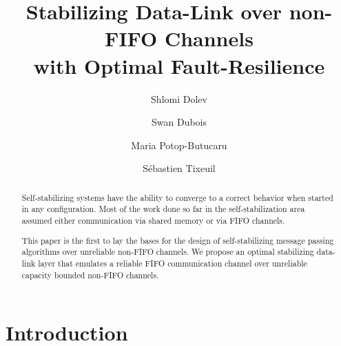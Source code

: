 \documentclass[11pt]{article}
\begin{document}
\renewcommand{\thefootnote}{\fnsymbol{footnote}}

\title{Stabilizing Data-Link over non-FIFO Channels\\ with Optimal Fault-Resilience}

\author{
Shlomi Dolev\footnotemark[1] \and 
Swan Dubois\footnotemark[2] \and 
Maria Potop-Butucaru\footnotemark[2] \and 
S\'ebastien Tixeuil\footnotemark[3]}
\date{}

\maketitle





\begin{abstract}
Self-stabilizing systems have the ability to converge to a correct behavior when started in any configuration. Most of the work done so far in the self-stabilization area assumed either communication via shared memory or via FIFO channels. 

This paper is the first to lay the bases for the design of self-stabilizing message passing algorithms over unreliable non-FIFO channels. We propose an optimal stabilizing data-link layer that emulates a reliable FIFO communication channel over unreliable capacity bounded non-FIFO channels.   
\end{abstract}

\maketitle

\renewcommand{\thefootnote}{\arabic{footnote}}

\section{Introduction}
\end{document}
